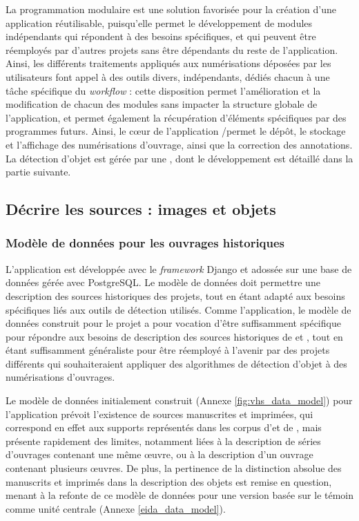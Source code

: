     La programmation modulaire est une solution favorisée pour la création d'une application réutilisable, puisqu'elle permet le développement de modules indépendants qui répondent à des besoins spécifiques, et qui peuvent être réemployés par d'autres projets sans être dépendants du reste de l'application. Ainsi, les différents traitements appliqués aux numérisations déposées par les utilisateurs font appel à des outils divers, indépendants, dédiés chacun à une tâche spécifique du \textit{workflow} : cette disposition permet l'amélioration et la modification de chacun des modules sans impacter la structure globale de l'application, et permet également la récupération d'éléments spécifiques par des programmes futurs. Ainsi, le cœur de l'application \eida/\vhs permet le dépôt, le stockage et l'affichage des numérisations d'ouvrage, ainsi que la correction des annotations. La détection d'objet est gérée par une \api, dont le développement est détaillé dans la partie suivante.
    
\subsection{Décrire les sources : images et objets}
    \subsubsection{Modèle de données pour les ouvrages historiques}
    L'application \vhs est développée avec le \textit{framework} Django et adossée sur une base de données gérée avec PostgreSQL. Le modèle de données doit permettre une description des sources historiques des projets, tout en étant adapté aux besoins spécifiques liés aux outils de détection utilisés. Comme l'application, le modèle de données construit pour le projet a pour vocation d'être suffisamment spécifique pour répondre aux besoins de description des sources historiques de \vhs et \eida, tout en étant suffisamment généraliste pour être réemployé à l'avenir par des projets différents qui souhaiteraient appliquer des algorithmes de détection d'objet à des numérisations d'ouvrages.
    
    Le modèle de données initialement construit (Annexe \ref{fig:vhs_data_model}) pour l'application \vhs prévoit l'existence de sources manuscrites et imprimées, qui correspond en effet aux supports représentés dans les corpus d'\eida et de \vhs, mais présente rapidement des limites, notamment liées à la description de séries d'ouvrages contenant une même œuvre, ou à la description d'un ouvrage contenant plusieurs œuvres. De plus, la pertinence de la distinction absolue des manuscrits et imprimés dans la description des objets est remise en question, menant à la refonte de ce modèle de données pour une version basée sur le témoin comme unité centrale (Annexe \ref{eida_data_model}). 
    
